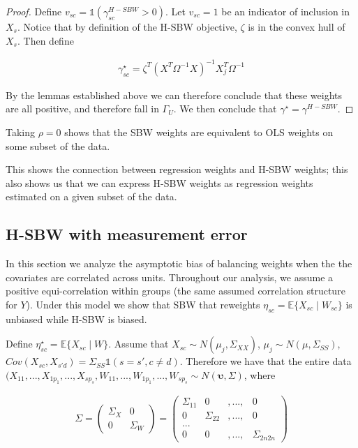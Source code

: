 \begin{proof}
Define $v_{sc} = \mathds{1}(\gamma_{sc}^{H-SBW} > 0)$. Let $v_{sc} = 1$ be an indicator of inclusion in $X_s$. Notice that by definition of the H-SBW objective, $\zeta$ is in the convex hull of $X_s$. Then define

\begin{align*}
    \gamma_{sc}^\star = \zeta^T(X^T\Omega^{-1}X)^{-1}X_j^T\Omega^{-1}
\end{align*}

By the lemmas established above we can therefore conclude that these weights are all positive, and therefore fall in $\Gamma_U$. We then conclude that $\gamma^\star = \gamma^{H-SBW}$.
\end{proof}

\begin{remark}
Taking $\rho = 0$ shows that the SBW weights are equivalent to OLS weights on some subset of the data.
\end{remark}

This shows the connection between regression weights and H-SBW weights; this also shows us that we can express H-SBW weights as regression weights estimated on a given subset of the data.

\subsection{H-SBW with measurement error}

In this section we analyze the asymptotic bias of balancing weights when the the covariates are correlated across units. Throughout our analysis, we assume a positive equi-correlation within groups (the same assumed correlation structure for $Y$). Under this model we show that SBW that reweights $\eta_{sc} = \mathbb{E}\{X_{sc} \mid W_{sc}\}$ is unbiased while H-SBW is biased. 

Define $\eta^\star_{sc} = \mathbb{E}\{X_{sc} \mid W\}$. Assume that $X_{sc} \sim N(\mu_j, \Sigma_{XX})$, $\mu_j \sim N(\mu, \Sigma_{SS})$, $Cov(X_{sc}, X_{s'd}) = \Sigma_{SS}\mathds{1}(s = s', c \ne d)$. Therefore we have that the entire data $(X_{11}, ..., X_{1p_1}, ..., X_{sp_s}, W_{11}, ..., W_{1p_1}, ..., W_{sp_s} \sim N(\mathbf{\upsilon}, \Sigma)$, where 

\begin{align*}
\Sigma = \begin{pmatrix}
\Sigma_{X} & 0 \\
0 & \Sigma_{W}
\end{pmatrix} = \begin{pmatrix}
\Sigma_{11} & 0 &, ..., &0 \\
0 & \Sigma_{22} &, ..., &0 \\
... \\
0 & 0 & ,... , & \Sigma_{2n2n}
\end{pmatrix} 
\end{align*}

